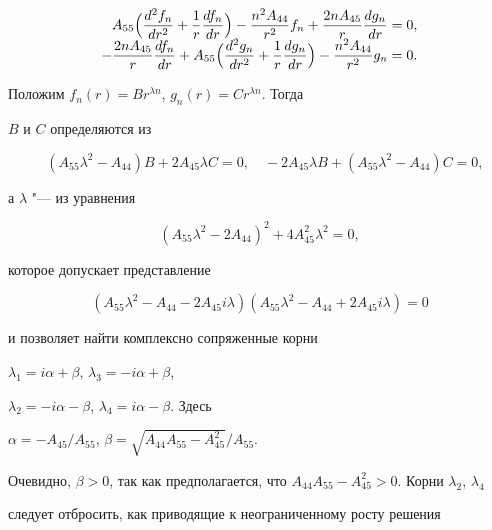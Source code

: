 $$

\begin{array}{r}

\displaystyle

 A_{55}\Bigl(\dfrac{d^2 f_n}{dr^2}+\dfrac{1}{r}\dfrac{df_n}{dr} \Bigr)-

 \dfrac{n^2A_{44}}{r^2}f_n+\dfrac{2n A_{45}}{r}\dfrac{dg_n}{dr}=0, \\

 \displaystyle

 -\dfrac{2n A_{45}}{r}\dfrac{df_n}{dr}+ A_{55} \Bigl(\dfrac{d^2 g_n}{dr^2}+\dfrac{1}{r}\dfrac{dg_n}{dr} \Bigr)-\dfrac{n^2A_{44}}{r^2}g_n=0.

 \end{array}

 $$

Положим $ f_n(r)=Br^{\lambda n}$, $g_n(r)=Cr^{\lambda n} $. Тогда

$ B$ и $C$ определяются из 

$$

\phantom{-\!}\left(A_{55}\lambda^2-A_{44}

\right)B+2A_{45}\lambda C=0,\quad

 -2A_{45}\lambda B+ \left(A_{55}\lambda^2-A_{44} \right)C=0,

$$

а $\lambda $ "--- из уравнения

\[

\left(A_{55}\lambda^2-2A_{44} \right)^2+4A_{45}^2\lambda^2=0,

\]

которое допускает представление 

\[

\left(A_{55}\lambda^2-A_{44}-2A_{45}i\lambda

\right)(A_{55}\lambda^2-A_{44}+2A_{45}i\lambda)=0

\]

и  позволяет  найти комплексно сопряженные корни

$\lambda_1=i\alpha+\beta$, $\lambda_3=-i\alpha+\beta$,

$\lambda_2=-i\alpha-\beta$, $\lambda_4=i\alpha-\beta$. Здесь

$\alpha=-{A_{45}}/{A_{55}}$, $\beta={ \sqrt{A_{44}A_{55}-A_{45}^2}}/{A_{55}}$.

Очевидно, $ \beta>0 $, так как предполагается, что $

A_{44}A_{55}-A_{45}^2 >0$. Корни $ \lambda_2$, $\lambda_4 $

следует отбросить, как приводящие к неограниченному росту решения

